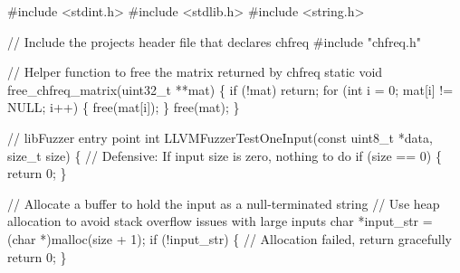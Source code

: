 \documentclass[
  a4paper,
]{scrreprt}
\newenvironment{Shaded}{\begin{snugshade}}{\end{snugshade}}
\newcommand{\CommentTok}[1]{\textcolor[rgb]{0.41,0.41,0.41}{#1}}
\newcommand{\ControlFlowTok}[1]{\textcolor[rgb]{0.85,0.12,0.09}{#1}}
\newcommand{\DataTypeTok}[1]{\textcolor[rgb]{0.47,0.16,0.63}{#1}}
\newcommand{\DecValTok}[1]{\textcolor[rgb]{0.47,0.16,0.63}{#1}}
\newcommand{\ImportTok}[1]{\textcolor[rgb]{0.33,0.33,0.33}{#1}}
\newcommand{\NormalTok}[1]{\textcolor[rgb]{0.33,0.33,0.33}{#1}}
\newcommand{\OperatorTok}[1]{\textcolor[rgb]{0.00,0.46,0.62}{#1}}
\newcommand{\PreprocessorTok}[1]{\textcolor[rgb]{0.47,0.16,0.63}{#1}}
\theoremstyle{definition}
\theoremstyle{remark}
\begin{document}
\begin{Shaded}
\begin{Highlighting}[numbers=left,,]
\PreprocessorTok{\#include }\ImportTok{\textless{}stdint.h\textgreater{}}
\PreprocessorTok{\#include }\ImportTok{\textless{}stdlib.h\textgreater{}}
\PreprocessorTok{\#include }\ImportTok{\textless{}string.h\textgreater{}}

\CommentTok{// Include the project\textquotesingle{}s header file that declares chfreq}
\PreprocessorTok{\#include }\ImportTok{"chfreq.h"}

\CommentTok{// Helper function to free the matrix returned by chfreq}
\DataTypeTok{static} \DataTypeTok{void}\NormalTok{ free\_chfreq\_matrix}\OperatorTok{(}\DataTypeTok{uint32\_t} \OperatorTok{**}\NormalTok{mat}\OperatorTok{)} \OperatorTok{\{}
    \ControlFlowTok{if} \OperatorTok{(!}\NormalTok{mat}\OperatorTok{)} \ControlFlowTok{return}\OperatorTok{;}
    \ControlFlowTok{for} \OperatorTok{(}\DataTypeTok{int}\NormalTok{ i }\OperatorTok{=} \DecValTok{0}\OperatorTok{;}\NormalTok{ mat}\OperatorTok{[}\NormalTok{i}\OperatorTok{]} \OperatorTok{!=}\NormalTok{ NULL}\OperatorTok{;}\NormalTok{ i}\OperatorTok{++)} \OperatorTok{\{}
\NormalTok{        free}\OperatorTok{(}\NormalTok{mat}\OperatorTok{[}\NormalTok{i}\OperatorTok{]);}
    \OperatorTok{\}}
\NormalTok{    free}\OperatorTok{(}\NormalTok{mat}\OperatorTok{);}
\OperatorTok{\}}

\CommentTok{// libFuzzer entry point}
\DataTypeTok{int}\NormalTok{ LLVMFuzzerTestOneInput}\OperatorTok{(}\DataTypeTok{const} \DataTypeTok{uint8\_t} \OperatorTok{*}\NormalTok{data}\OperatorTok{,} \DataTypeTok{size\_t}\NormalTok{ size}\OperatorTok{)} \OperatorTok{\{}
    \CommentTok{// Defensive: If input size is zero, nothing to do}
    \ControlFlowTok{if} \OperatorTok{(}\NormalTok{size }\OperatorTok{==} \DecValTok{0}\OperatorTok{)} \OperatorTok{\{}
        \ControlFlowTok{return} \DecValTok{0}\OperatorTok{;}
    \OperatorTok{\}}

    \CommentTok{// Allocate a buffer to hold the input as a null{-}terminated string}
    \CommentTok{// Use heap allocation to avoid stack overflow issues with large inputs}
    \DataTypeTok{char} \OperatorTok{*}\NormalTok{input\_str }\OperatorTok{=} \OperatorTok{(}\DataTypeTok{char} \OperatorTok{*)}\NormalTok{malloc}\OperatorTok{(}\NormalTok{size }\OperatorTok{+} \DecValTok{1}\OperatorTok{);}
    \ControlFlowTok{if} \OperatorTok{(!}\NormalTok{input\_str}\OperatorTok{)} \OperatorTok{\{}
        \CommentTok{// Allocation failed, return gracefully}
        \ControlFlowTok{return} \DecValTok{0}\OperatorTok{;}
    \OperatorTok{\}}


\end{Highlighting}
\end{Shaded}
\end{document}
